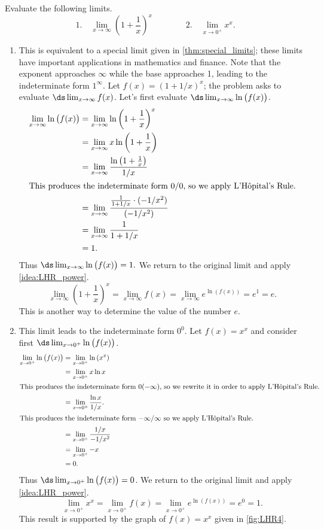 {Evaluate the following limits.
\[
 \text{1.}\quad\lim_{x\to\infty} \left(1+\frac1x\right)^x \qquad\qquad
 \text{2.}\quad\lim_{x\to0^+} x^x.
\]}
{\begin{enumerate}
\item		This is equivalent to a special limit given in \autoref{thm:special_limits}; these limits have important applications in mathematics and finance. Note that the exponent approaches $\infty$ while the base approaches 1, leading to the indeterminate form $1^\infty$. Let $f(x) = (1+1/x)^x$; the problem asks to evaluate $\ds\lim_{x\to\infty}f(x)$. Let's first evaluate $\ds \lim_{x\to\infty}\ln\big(f(x)\big)$.
\begin{align*}
\lim_{x\to\infty}\ln\big(f(x)\big)
			&= \lim_{x\to\infty} \ln \left(1+\frac1x\right)^x \\
			&= \lim_{x\to\infty} x\ln\left(1+\frac1x\right)\\
			&= \lim_{x\to\infty} \frac{\ln\left(1+\frac1x\right)}{1/x}\\
			\intertext{This produces the indeterminate form 0/0, so we apply L'H\^opital's Rule.}
			&=	\lim_{x\to\infty} \frac{\frac{1}{1+1/x}\cdot(-1/x^2)}{(-1/x^2)} \\
			&= \lim_{x\to\infty}\frac{1}{1+1/x}\\
			&= 1.
\end{align*}
Thus $\ds\lim_{x\to\infty} \ln \big(f(x)\big) = 1.$ We return to the original limit and apply \autoref{idea:LHR_power}.
$$\lim_{x\to\infty}\left(1+\frac1x\right)^x = \lim_{x\to\infty} f(x) =  \lim_{x\to\infty}e^{\ln (f(x))} = e^1 = e.$$
This is another way to determine the value of the number $e$.

\item		This limit leads to the indeterminate form $0^0$. Let $f(x) = x^x$ and consider first $\ds\lim_{x\to0^+} \ln\big(f(x)\big)$. 
\begin{align*}
\lim_{x\to0^+} \ln\big(f(x)\big) &= \lim_{x\to0^+} \ln\left(x^x\right) \\
			&= \lim_{x\to0^+} x\ln x \\
			\intertext{This produces the indeterminate form $0(-\infty)$, so we rewrite it in order to apply L'H\^opital's Rule.}
			&= \lim_{x\to0^+} \frac{\ln x}{1/x}.\\
			\intertext{This produces the indeterminate form $-\infty/\infty$ so we apply L'H\^opital's Rule.}
			&=	\lim_{x\to0^+} \frac{1/x}{-1/x^2} \\
			&= \lim_{x\to0^+} -x \\
			&= 0.
\end{align*}
Thus $\ds\lim_{x\to0^+} \ln\big(f(x)\big) =0$. We return to the original limit and apply \autoref{idea:LHR_power}.
$$\lim_{x\to0^+} x^x = \lim_{x\to0^+} f(x) = \lim_{x\to0^+} e^{\ln(f(x))} = e^0 = 1.$$
This result is supported by the graph of $f(x)=x^x$ given in \autoref{fig:LHR4}.\eoehere
\end{enumerate}}

